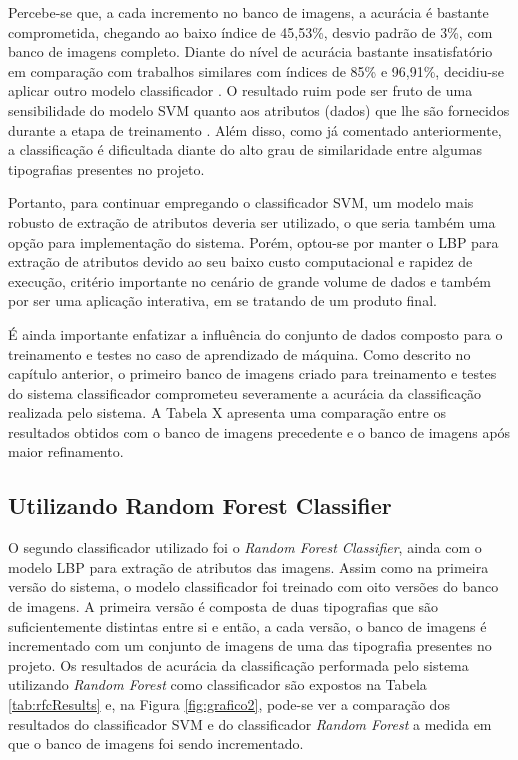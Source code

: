 Percebe-se que, a cada incremento no banco de imagens, a acurácia é bastante comprometida, chegando ao baixo índice de 45,53\%, desvio padrão de 3\%, com banco de imagens completo. Diante do nível de acurácia bastante insatisfatório em comparação com trabalhos similares com índices de 85\% e 96,91\%, decidiu-se aplicar outro modelo classificador  . O resultado ruim pode ser fruto de uma sensibilidade do modelo SVM quanto aos atributos (dados) que lhe são fornecidos durante a etapa de treinamento . Além disso, como já comentado anteriormente, a classificação é dificultada diante do alto grau de similaridade entre algumas tipografias presentes no projeto.

Portanto, para continuar empregando o classificador SVM, um modelo mais robusto de extração de atributos deveria ser utilizado, o que seria também uma opção para implementação do sistema. Porém, optou-se por manter o LBP para extração de atributos devido ao seu baixo custo computacional e rapidez de execução, critério importante no cenário de grande volume de dados e também por ser uma aplicação interativa, em se tratando de um produto final.

É ainda importante enfatizar a influência do conjunto de dados composto para o treinamento e testes no caso de aprendizado de máquina. Como descrito no capítulo anterior, o primeiro banco de imagens criado para treinamento e testes do sistema classificador comprometeu severamente a acurácia da classificação realizada pelo sistema. A Tabela X apresenta uma comparação entre os resultados obtidos com o banco de imagens precedente e o banco de imagens após maior refinamento.

\subsection{Utilizando Random Forest Classifier}

O segundo classificador utilizado foi o \textit{Random Forest Classifier}, ainda com o modelo LBP para extração de atributos das imagens. Assim como na primeira versão do sistema, o modelo classificador foi treinado com oito versões do banco de imagens. A primeira versão é composta de duas tipografias que são suficientemente distintas entre si e então, a cada versão, o banco de imagens é incrementado com um conjunto de imagens de uma das tipografia presentes no projeto. Os resultados de acurácia da classificação performada pelo sistema utilizando \textit{Random Forest} como classificador são expostos na Tabela \ref{tab:rfcResults} e, na Figura \ref{fig:grafico2}, pode-se ver a comparação dos resultados do classificador SVM e do classificador \textit{Random Forest} a medida em que o banco de imagens foi sendo incrementado.


